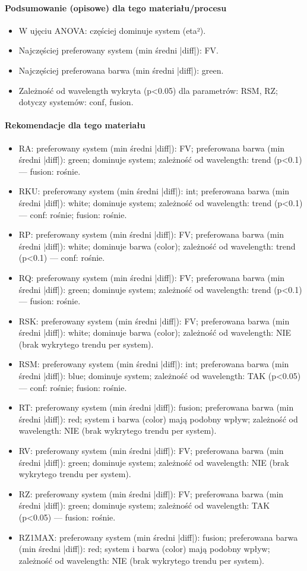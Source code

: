 \documentclass[
  10pt,
]{article}
\begin{document}
\paragraph{Podsumowanie (opisowe) dla tego materiału/procesu}
\begin{itemize}
\item W ujęciu ANOVA: częściej dominuje system (eta²).
\item Najczęściej preferowany system (min średni |diff|): FV.
\item Najczęściej preferowana barwa (min średni |diff|): green.
\item Zależność od wavelength wykryta (p<0.05) dla parametrów: RSM, RZ; dotyczy systemów: conf, fusion.
\end{itemize}
\paragraph{Rekomendacje dla tego materiału}
\begin{itemize}
\item RA: preferowany system (min średni |diff|): FV; preferowana barwa (min średni |diff|): green; dominuje system; zależność od wavelength: trend (p<0.1) — fusion: rośnie.
\item RKU: preferowany system (min średni |diff|): int; preferowana barwa (min średni |diff|): white; dominuje system; zależność od wavelength: trend (p<0.1) — conf: rośnie; fusion: rośnie.
\item RP: preferowany system (min średni |diff|): FV; preferowana barwa (min średni |diff|): white; dominuje barwa (color); zależność od wavelength: trend (p<0.1) — conf: rośnie.
\item RQ: preferowany system (min średni |diff|): FV; preferowana barwa (min średni |diff|): green; dominuje system; zależność od wavelength: trend (p<0.1) — fusion: rośnie.
\item RSK: preferowany system (min średni |diff|): FV; preferowana barwa (min średni |diff|): white; dominuje barwa (color); zależność od wavelength: NIE (brak wykrytego trendu per system).
\item RSM: preferowany system (min średni |diff|): int; preferowana barwa (min średni |diff|): blue; dominuje system; zależność od wavelength: TAK (p<0.05) — conf: rośnie; fusion: rośnie.
\item RT: preferowany system (min średni |diff|): fusion; preferowana barwa (min średni |diff|): red; system i barwa (color) mają podobny wpływ; zależność od wavelength: NIE (brak wykrytego trendu per system).
\item RV: preferowany system (min średni |diff|): FV; preferowana barwa (min średni |diff|): green; dominuje system; zależność od wavelength: NIE (brak wykrytego trendu per system).
\item RZ: preferowany system (min średni |diff|): FV; preferowana barwa (min średni |diff|): green; dominuje system; zależność od wavelength: TAK (p<0.05) — fusion: rośnie.
\item RZ1MAX: preferowany system (min średni |diff|): fusion; preferowana barwa (min średni |diff|): red; system i barwa (color) mają podobny wpływ; zależność od wavelength: NIE (brak wykrytego trendu per system).
\end{itemize}
\end{document}
